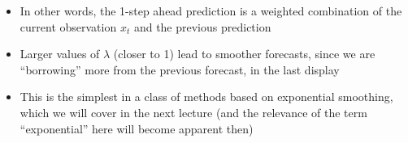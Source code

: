 \documentclass{article}
\begin{document}
\begin{itemize}
\item In other words, the 1-step ahead prediction is a weighted combination of
  the current observation $x_t$ and the previous prediction 

\item Larger values of $\lambda$ (closer to 1) lead to smoother forecasts, since
  we are ``borrowing'' more from the previous forecast, in the last
  display

\item This is the simplest in a class of methods based on exponential smoothing,
  which we will cover in the next lecture (and the relevance of the term
  ``exponential'' here will become apparent then) 
\end{itemize}
\end{document}
